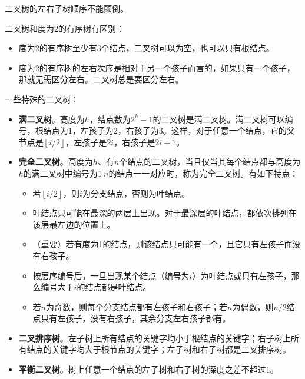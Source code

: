 \documentclass[12pt, a4paper, oneside]{ctexart}
\begin{document}
二叉树的左右子树顺序不能颠倒。

二叉树和度为2的有序树有区别：
\begin{itemize}
  \item 度为2的有序树至少有3个结点，二叉树可以为空，也可以只有根结点。
  \item 度为2的有序树的左右次序是相对于另一个孩子而言的，如果只有一个孩子，那就无需区分左右。二叉树总是要区分左右。
\end{itemize}

一些特殊的二叉树：
\begin{itemize}
  \item {\bf 满二叉树}。高度为$h$，结点数为$2^h-1$的二叉树是满二叉树。满二叉树可以编号，根结点为1，左孩子为2，右孩子为3。这样，对于任意一个结点，它的父节点是$\left\lfloor i/2 \right\rfloor$，左孩子是$2i$，右孩子是$2i+1$。
  \item {\bf 完全二叉树}。高度为$h$、有$n$个结点的二叉树，当且仅当其每个结点都与高度为$h$的满二叉树中编号为$1~n$的结点一一对应时，称为完全二叉树。有如下特点：
  \begin{itemize}
    \item 若$\left\lfloor i/2 \right\rfloor$，则$i$为分支结点，否则为叶结点。
    \item 叶结点只可能在最深的两层上出现。对于最深层的叶结点，都依次排列在该层最左边的位置上。
    \item （重要）若有度为1的结点，则该结点只可能有一个，且它只有左孩子而没有右孩子。
    \item 按层序编号后，一旦出现某个结点（编号为$i$）为叶结点或只有左孩子，那么编号大于$i$的结点都是叶结点。
    \item 若$n$为奇数，则每个分支结点都有左孩子和右孩子；若$n$为偶数，则$n/2$结点只有左孩子，没有右孩子，其余分支左右孩子都有。
  \end{itemize}

  \item {\bf 二叉排序树}。左子树上所有结点的关键字均小于根结点的关键字；右子树上所有结点的关键字均大于根节点的关键字；左子树和右子树都是二叉排序树。
  \item {\bf 平衡二叉树}。树上任意一个结点的左子树和右子树的深度之差不超过1。
\end{itemize}
\end{document}
